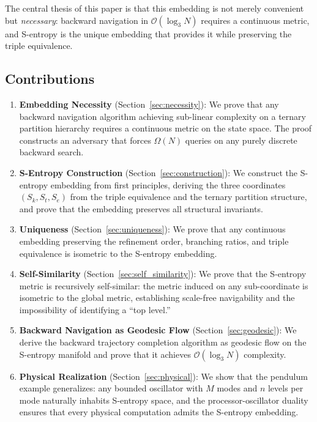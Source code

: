 \documentclass[12pt,twocolumn]{article}
\begin{document}
The central thesis of this paper is that this embedding is not merely convenient but \emph{necessary}: backward navigation in $\mathcal{O}(\log_3 N)$ requires a continuous metric, and S-entropy is the unique embedding that provides it while preserving the triple equivalence.

\subsection{Contributions}

\begin{enumerate}[leftmargin=*]
\item \textbf{Embedding Necessity} (Section~\ref{sec:necessity}): We prove that any backward navigation algorithm achieving sub-linear complexity on a ternary partition hierarchy requires a continuous metric on the state space. The proof constructs an adversary that forces $\Omega(N)$ queries on any purely discrete backward search.

\item \textbf{S-Entropy Construction} (Section~\ref{sec:construction}): We construct the S-entropy embedding from first principles, deriving the three coordinates $(S_k, S_t, S_e)$ from the triple equivalence and the ternary partition structure, and prove that the embedding preserves all structural invariants.

\item \textbf{Uniqueness} (Section~\ref{sec:uniqueness}): We prove that any continuous embedding preserving the refinement order, branching ratios, and triple equivalence is isometric to the S-entropy embedding.

\item \textbf{Self-Similarity} (Section~\ref{sec:self_similarity}): We prove that the S-entropy metric is recursively self-similar: the metric induced on any sub-coordinate is isometric to the global metric, establishing scale-free navigability and the impossibility of identifying a ``top level.''

\item \textbf{Backward Navigation as Geodesic Flow} (Section~\ref{sec:geodesic}): We derive the backward trajectory completion algorithm as geodesic flow on the S-entropy manifold and prove that it achieves $\mathcal{O}(\log_3 N)$ complexity.

\item \textbf{Physical Realization} (Section~\ref{sec:physical}): We show that the pendulum example generalizes: any bounded oscillator with $M$ modes and $n$ levels per mode naturally inhabits S-entropy space, and the processor-oscillator duality~\cite{landau1980statistical} ensures that every physical computation admits the S-entropy embedding.
\end{enumerate}
\end{document}
